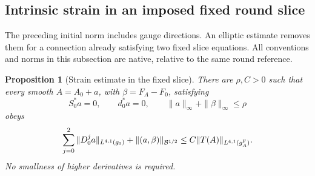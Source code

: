 \documentclass[11pt]{article}
\numberwithin{equation}{section}
\newtheorem{proposition}[theorem]{Proposition}
\theoremstyle{definition}
\theoremstyle{remark}
\begin{document}
\subsection{Intrinsic strain in an imposed fixed round slice}
\label{subsec:fixed-slice-strain}

The preceding initial norm includes gauge directions.
An elliptic estimate removes them for a connection
already satisfying two fixed slice equations.
All conventions and norms in this subsection are
native, relative to the same round reference.

\begin{proposition}[Strain estimate in the fixed slice]
\label{prop:fixed-slice-strain}
There are $\rho,C>0$ such that every smooth
$A=A_0+a$, with $\beta=F_A-F_0$, satisfying
\begin{equation}\label{eq:fixed-slice-hypotheses}
 S_0^*a=0,\qquad d_0^*a=0,\qquad
 \|a\|_\infty+\|\beta\|_\infty\le\rho
\end{equation}
obeys
\[
 \sum_{j=0}^2\|D_0^ja\|_{L^{4,1}(g_0)}
       +\|(a,\beta)\|_{\mathcal B^{1/2}}
 \le C\|T(A)\|_{L^{4,1}(g_A^{\rm F})}.
\]
No smallness of higher derivatives is required.
\end{proposition}
\end{document}
